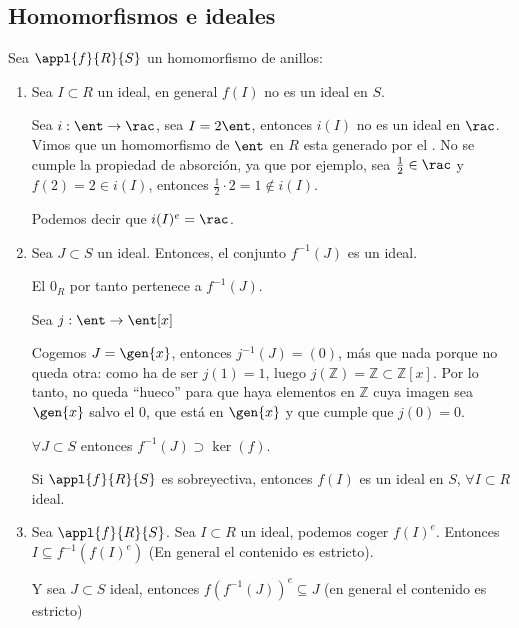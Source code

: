 \subsection{Homomorfismos e ideales}
Sea $\appl{f}{R}{S}$ un homomorfismo de anillos:
\begin{enumerate}
	\item Sea $I \subset R$ un ideal, en general $f(I)$ no es un ideal en $S$.
	\begin{example}
		Sea $i:\ent \rightarrow \rac$, sea $I=2\ent$, entonces $i(I)$ no es un ideal en $\rac$. Vimos que un homomorfismo de $\ent$ en $R$ esta generado por el \one. No se cumple la propiedad de absorción, ya que por ejemplo, sea $\frac{1}{2} \in \rac$ y $f(2)=2 \in i(I)$, entonces $\frac{1}{2}\cdot2=1 \notin i(I)$.

		Podemos decir que $i(I)^e=\rac$.
	\end{example}
	\item Sea $J \subset S$ un ideal. Entonces, el conjunto $f^{-1}(J)$ es un ideal.

	El $0_R$ por tanto pertenece a $f^{-1}(J)$.
	\begin{example}
		Sea $j: \ent \rightarrow \ent[x]$

		Cogemos $J=\gen{x}$, entonces $j^{-1}(J)=(0)$, más que nada porque no queda otra: como ha de ser $j(1) = 1$, luego $j(ℤ) = ℤ ⊂ ℤ[x]$. Por lo tanto, no queda ``hueco'' para que haya elementos en $ℤ$ cuya imagen sea $\gen{x}$ salvo el $0$, que está en $\gen{x}$ y que cumple que $j(0) = 0$.
	\end{example}
	\obs $\forall J \subset S$ entonces $f^{-1}(J)\supset \ker(f)$.
	\begin{prop}
		Si $\appl{f}{R}{S}$ es sobreyectiva, entonces $f(I)$ es un ideal en $S$, $\forall I \subset R$ ideal.
	\end{prop}
	\item Sea $\appl{f}{R}{S}$. Sea $I \subset R$ un ideal, podemos coger $f(I)^e$. Entonces $I\subseteq f^{-1}(f(I)^e)$ (En general el contenido es estricto).

	Y sea $J \subset S$ ideal, entonces $f(f^{-1}(J))^e \subseteq J$ (en general el contenido es estricto)
\end{enumerate}

